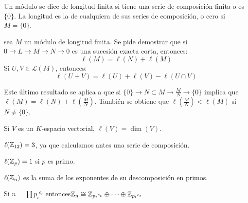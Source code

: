 \begin{df}
  Un módulo se dice de longitud finita si tiene una serie de composición
  finita o es \(\{0\}\). La longitud es la de cualquiera
  de sus series de composición, o cero si \(M=\{0\}\).
\end{df}

\begin{ejercicio} sea \(M\) un módulo de longitud finita. Se pide demostrar
que si \(0\longrightarrow L\longrightarrow M\longrightarrow N\longrightarrow
0\) es una sucesión exacta corta, entonces:
\[
  \ell(M)=\ell(N)+\ell(M)
\]
Si \(U,V\in\mathcal{L}(M)\), entonces:
\[
  \ell(U+V)=\ell(U)+\ell(V)-\ell(U\cap V)
\]
\end{ejercicio}
Este último resultado se aplica a que si \(\{0\} \longrightarrow N \subset
M \longrightarrow \frac{M}{N} \longrightarrow \{0\}\) implica que
\(\ell(M) = \ell(N) + \ell(\frac{M}{N})\). También se obtiene que
\(\ell(\frac{M}{N}) < \ell(M)\) si \(N \neq \{0\}\). 

\begin{ejercicio}
  Si \(V\) es un \(K\)-espacio vectorial, \(\ell(V)=\dim(V)\).
\end{ejercicio}

\begin{ejemplo}
  \(\ell(\mathbb{Z}_{12})=3\), ya que calculamos antes una serie de
  composición.
\end{ejemplo}

\begin{ejemplo}
  \(\ell(\mathbb{Z}_p)=1\) si \(p\) es primo.
\end{ejemplo}

\begin{ejercicio}
  \(\ell(\mathbb{Z}_n)\) es la suma de los exponentes de su descomposición
  en primos.
\end{ejercicio}

\begin{ejemplo}
  Si \(n=\prod {p_i}^{e_i}\) entonces\(\mathbb{Z}_n\cong
  \mathbb{Z}_{{p_t}^{e_t}}\oplus\cdots \oplus\mathbb{Z}_{{p_t}^{e_t}}\)
\end{ejemplo}